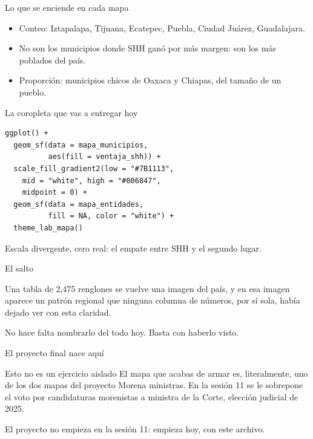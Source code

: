 \begin{frame}{Lo que se enciende en cada mapa}
  \vspace{0.3em}
  \begin{itemize}\setlength{\itemsep}{0.8em}
    \item<1-> \ac{Conteo}: Iztapalapa, Tijuana, Ecatepec, Puebla,
          Ciudad Juárez, Guadalajara.
    \item<2-> No son los municipios donde SHH ganó por más margen:
          son los más poblados del país.
    \item<3-> \ac{Proporción}: municipios chicos de Oaxaca y
          Chiapas, del tamaño de un pueblo.
  \end{itemize}

  \vspace{1.1em}
\end{frame}

\begin{frame}[fragile]{La coropleta que vas a entregar hoy}
\begin{lstlisting}
ggplot() +
  geom_sf(data = mapa_municipios,
          aes(fill = ventaja_shh)) +
  scale_fill_gradient2(low = "#7B1113",
    mid = "white", high = "#006847",
    midpoint = 0) +
  geom_sf(data = mapa_entidades,
          fill = NA, color = "white") +
  theme_lab_mapa()
\end{lstlisting}

  \vspace{0.4em}
  {\small\color{grisTenue}Escala divergente, cero real: el empate
  entre SHH y el segundo lugar.}
\end{frame}

\begin{frame}{El salto}
  \vspace{0.6em}
  \begin{saltobox}
    Una tabla de 2,475 renglones se vuelve una imagen del país, y en
    esa imagen aparece un patrón regional que ninguna columna de
    números, por sí sola, había dejado ver con esta claridad.
  \end{saltobox}

  \vspace{1.2em}
  No hace falta nombrarlo del todo hoy. Basta con haberlo visto.
\end{frame}

\begin{frame}{El proyecto final nace aquí}
  \vspace{0.3em}
  \begin{block}{Esto no es un ejercicio aislado}
    El mapa que acabas de armar es, literalmente, uno de los dos
    mapas del proyecto Morena \texttimes{} ministras. En la sesión
    11 se le sobrepone el voto por candidaturas morenistas a
    ministra de la Corte, elección judicial de 2025.
  \end{block}

  \vspace{1.0em}
  {\small\color{grisTenue}El proyecto no empieza en la sesión 11:
  empieza hoy, con este archivo.}
\end{frame}

